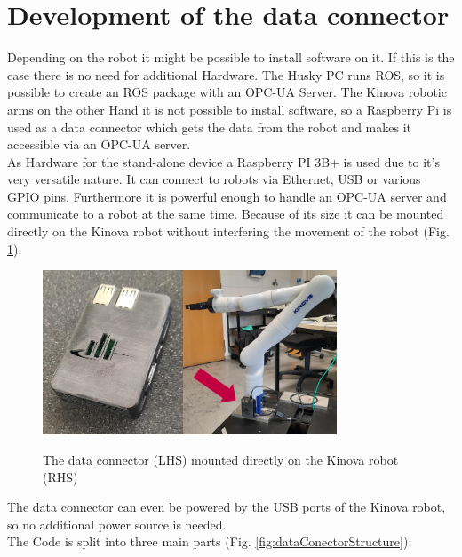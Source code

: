 \documentclass[conference]{IEEEtran}
\begin{document}
\section{Development of the data connector}
Depending on the robot it might be possible to install software on it.
If this is the case there is no need for additional Hardware.
The Husky PC runs ROS, so it is possible to create an ROS package with an OPC-UA Server.
The Kinova robotic arms on the other Hand it is not possible to install software, so a Raspberry Pi is used as a data connector which gets the data from the robot and makes it accessible via an OPC-UA server.\\
As Hardware for the stand-alone device a Raspberry PI 3B+ is used due to it's very versatile nature. It can connect to robots via Ethernet, USB or various GPIO pins.
Furthermore it is powerful enough to handle an OPC-UA server and communicate to a robot at the same time.
Because of its size it can be mounted directly on the Kinova robot without interfering the movement of the robot (Fig. \ref{fig:dataConectorPic}).\\

\begin{figure}[htbp]
    \centerline{\includegraphics[height=4.9cm]{Pictures/PiGehaeuseVorne.jpeg}\hspace{0.1cm}\includegraphics[height=4.9cm]{Pictures/PiAmKinova.jpeg}}
    \caption{The data connector (LHS) mounted directly on the Kinova robot (RHS)}
    \label{fig:dataConectorPic}
\end{figure}
The data connector can even be powered by the USB ports of the Kinova robot, so no additional power source is needed.\\
The Code is split into three main parts (Fig. \ref{fig:dataConectorStructure}).\\
\end{document}
